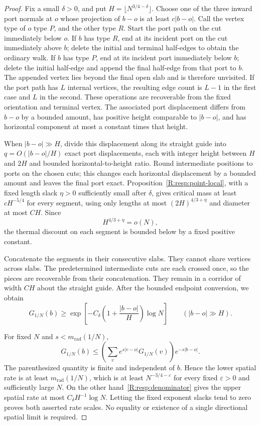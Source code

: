 \begin{proof}
Fix a small $\delta>0$, and put $H=\lfloor N^{3/4-\delta}\rfloor$. Choose one of the three inward port normals at $o$ whose projection of $b-o$ is at least $c|b-o|$. Call the vertex type of $o$ type $P$, and the other type $R$. Start the port path on the cut immediately below $o$. If $b$ has type $R$, end at its incident port on the cut immediately above $b$; delete the initial and terminal half-edges to obtain the ordinary walk. If $b$ has type $P$, end at its incident port immediately below $b$; delete the initial half-edge and append the final half-edge from that port to $b$. The appended vertex lies beyond the final open slab and is therefore unvisited. If the port path has $L$ internal vertices, the resulting edge count is $L-1$ in the first case and $L$ in the second. These operations are recoverable from the fixed orientation and terminal vertex. The associated port displacement differs from $b-o$ by a bounded amount, has positive height comparable to $|b-o|$, and has horizontal component at most a constant times that height.

When $|b-o|\gg H$, divide this displacement along its straight guide into $q=O(|b-o|/H)$ exact port displacements, each with integer height between $H$ and $2H$ and bounded horizontal-to-height ratio. Round intermediate positions to ports on the chosen cuts; this changes each horizontal displacement by a bounded amount and leaves the final port exact. Proposition~\ref{R:resp:point-local}, with a fixed length slack $\eta>0$ sufficiently small after $\delta$, gives critical mass at least $cH^{-5/4}$ for every segment, using only lengths at most $(2H)^{4/3+\eta}$ and diameter at most $C H$. Since
\[
 H^{4/3+\eta}=o(N),
\]
the thermal discount on each segment is bounded below by a fixed positive constant.

Concatenate the segments in their consecutive slabs. They cannot share vertices across slabs. The predetermined intermediate cuts are each crossed once, so the pieces are recoverable from their concatenation. They remain in a corridor of width $CH$ about the straight guide. After the bounded endpoint conversion, we obtain
\begin{equation}
 G_{1/N}(b)\ge
       \exp\left[-C_\delta\left(1+\frac{|b-o|}{H}\right)\log N\right]
 \qquad(|b-o|\gg H).
 \label{R:resp:denominator}
\end{equation}

For fixed $N$ and $s<m_{\mathrm{rad}}(1/N)$,
\[
 G_{1/N}(b)\le
 \left(\sum_v e^{s|v-o|}G_{1/N}(v)\right)e^{-s|b-o|}.
\]
The parenthesized quantity is finite and independent of $b$. Hence the lower spatial rate is at least $m_{\mathrm{rad}}(1/N)$, which is at least $N^{-3/4-\varepsilon}$ for every fixed $\varepsilon>0$ and sufficiently large $N$. On the other hand~\eqref{R:resp:denominator} gives the upper spatial rate at most $C_\delta H^{-1}\log N$. Letting the fixed exponent slacks tend to zero proves both asserted rate scales. No equality or existence of a single directional spatial limit is required.


\end{proof}
